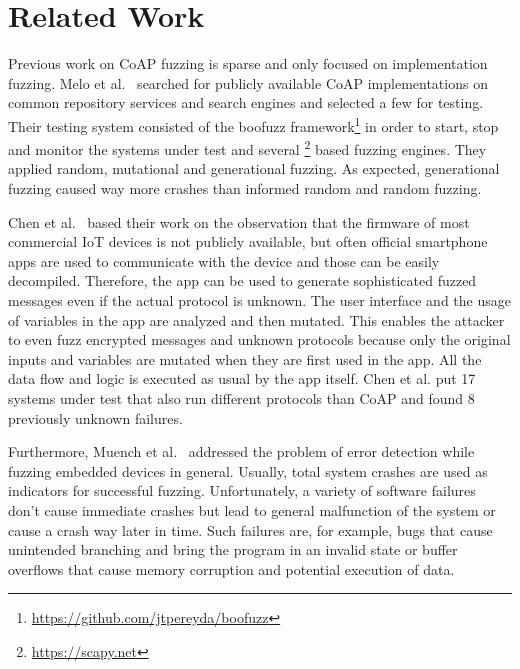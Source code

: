 \section{Related Work}
\label{section:related_work}


Previous work on CoAP fuzzing is sparse and only focused on implementation fuzzing. Melo et al.~\cite{Melo2017RobustnessTO} searched for publicly available CoAP implementations on common repository services and search engines and selected a few for testing. Their testing system consisted of the boofuzz framework\footnote{\url{https://github.com/jtpereyda/boofuzz}} in order to start, stop and monitor the systems under test and several \scapy\footnote{\url{https://scapy.net}} based fuzzing engines. They applied random, mutational and generational fuzzing. As expected, generational fuzzing caused way more crashes than informed random and random fuzzing.

Chen et al.~\cite{chen2018ndss} based their work on the observation that the firmware of most commercial IoT devices is not publicly available, but often official smartphone apps are used to communicate with the device and those can be easily decompiled. Therefore, the app can be used to generate sophisticated fuzzed messages even if the actual protocol is unknown. The user interface and the usage of variables in the app are analyzed and then mutated. This enables the attacker to even fuzz encrypted messages and unknown protocols because only the original inputs and variables are mutated when they are first used in the app. All the data flow and logic is executed as usual by the app itself. Chen et al. put 17 systems under test that also run different protocols than CoAP and found 8 previously unknown failures.

Furthermore, Muench et al.~\cite{EURECOM+5417} addressed the problem of error detection while fuzzing embedded devices in general. Usually, total system crashes are used as indicators for successful fuzzing. Unfortunately, a variety of software failures don't cause immediate crashes but lead to general malfunction of the system or cause a crash way later in time. Such failures are, for example, bugs that cause unintended branching and bring the program in an invalid state or buffer overflows that cause memory corruption and potential execution of data.

